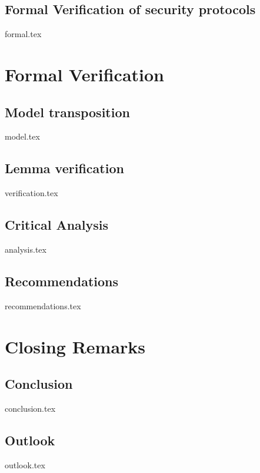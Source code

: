 \documentclass[a4paper,12pt,twoside]{report}
\begin{document}
\section{Formal Verification of security protocols}
\label{sec:formal}
{formal.tex}

\clearpage

\chapter{Formal Verification}
\label{chap:formal}

\section{Model transposition}
\label{sec:model}
{model.tex}

\section{Lemma verification}
\label{sec:goal}
{verification.tex}

\section{Critical Analysis}
\label{sec:method}
{analysis.tex}

\section{Recommendations}
\label{sec:method}
{recommendations.tex}

\clearpage

\chapter{Closing Remarks}
\label{chap:intro}

\section{Conclusion}
\label{sec:problem}
{conclusion.tex}

\section{Outlook}
\label{sec:goal}
{outlook.tex}

\clearpage

\printbibliography[title={Literature},heading=bibintoc,nottype=online]

\printbibliography[title={Online Sources},heading=bibintoc,type=online]

\clearpage

\appendices
\end{document}
